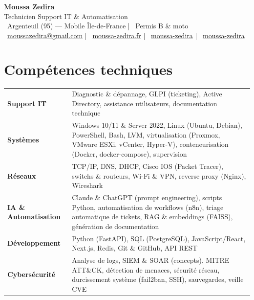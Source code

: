 \documentclass[a4paper,10pt]{article}
\begin{document}
\begin{center}
    {\Huge\bfseries\color{darktext} Moussa Zedira}\\[2pt]
    {\large\color{accent} Technicien Support IT \& Automatisation}\\[6pt]
    {\small
        \faMapMarker* \ Argenteuil (95) — Mobile Île-de-France \quad|\quad
        \faIdCard \ Permis B \& moto \\
        \faEnvelope \ \href{mailto:moussazedira@gmail.com}{moussazedira@gmail.com} \quad|\quad
        \faGlobe \ \href{https://moussa-zedira.fr}{moussa-zedira.fr} \quad|\quad
        \faLinkedin \ \href{https://www.linkedin.com/in/moussa-zedira-15abba3b8}{moussa-zedira} \quad|\quad
        \faGithub \ \href{https://github.com/moussa-zedira}{moussa-zedira}
    }
\end{center}

\vspace{4pt}

\section{Compétences techniques}

\begin{tabular}{@{}p{3.5cm}p{13.5cm}@{}}
    \textbf{Support IT} & Diagnostic \& dépannage, GLPI (ticketing), Active Directory, assistance utilisateurs, documentation technique \\[3pt]
    \textbf{Systèmes} & Windows 10/11 \& Server 2022, Linux (Ubuntu, Debian), PowerShell, Bash, LVM, virtualisation (Proxmox, VMware ESXi, vCenter, Hyper-V), conteneurisation (Docker, docker-compose), supervision \\[3pt]
    \textbf{Réseaux} & TCP/IP, DNS, DHCP, Cisco IOS (Packet Tracer), switchs \& routeurs, Wi-Fi \& VPN, reverse proxy (Nginx), Wireshark \\[3pt]
    \textbf{IA \& Automatisation} & Claude \& ChatGPT (prompt engineering), scripts Python, automatisation de workflows (n8n), triage automatique de tickets, RAG \& embeddings (FAISS), génération de documentation \\[3pt]
    \textbf{Développement} & Python (FastAPI), SQL (PostgreSQL), JavaScript/React, Next.js, Redis, Git \& GitHub, API REST \\[3pt]
    \textbf{Cybersécurité} & Analyse de logs, SIEM \& SOAR (concepts), MITRE ATT\&CK, détection de menaces, sécurité réseau, durcissement système (fail2ban, SSH), sauvegardes, veille CVE \\
\end{tabular}
\end{document}
